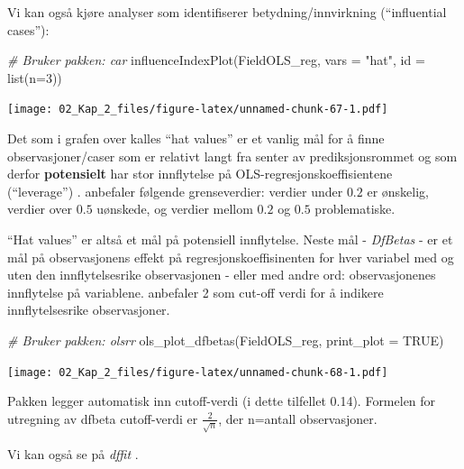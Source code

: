 \documentclass[
]{article}
\newenvironment{Shaded}{\begin{snugshade}}{\end{snugshade}}
\newcommand{\AttributeTok}[1]{\textcolor[rgb]{0.77,0.63,0.00}{#1}}
\newcommand{\CommentTok}[1]{\textcolor[rgb]{0.56,0.35,0.01}{\textit{#1}}}
\newcommand{\ConstantTok}[1]{\textcolor[rgb]{0.00,0.00,0.00}{#1}}
\newcommand{\DecValTok}[1]{\textcolor[rgb]{0.00,0.00,0.81}{#1}}
\newcommand{\FunctionTok}[1]{\textcolor[rgb]{0.00,0.00,0.00}{#1}}
\newcommand{\NormalTok}[1]{#1}
\newcommand{\StringTok}[1]{\textcolor[rgb]{0.31,0.60,0.02}{#1}}
\begin{document}
Vi kan også kjøre analyser som identifiserer betydning/innvirkning (``influential cases''):

\begin{Shaded}
\begin{Highlighting}[]
\CommentTok{\# Bruker pakken: car}
\FunctionTok{influenceIndexPlot}\NormalTok{(FieldOLS\_reg, }\AttributeTok{vars =} \StringTok{"hat"}\NormalTok{, }\AttributeTok{id =} \FunctionTok{list}\NormalTok{(}\AttributeTok{n=}\DecValTok{3}\NormalTok{))}
\end{Highlighting}
\end{Shaded}

\texttt{[image: 02\_Kap\_2\_files/figure-latex/unnamed-chunk-67-1.pdf]}

Det som i grafen over kalles ``hat values'' er et vanlig mål for å finne observasjoner/caser som er relativt langt fra senter av prediksjonsrommet og som derfor \textbf{potensielt} har stor innflytelse på OLS-regresjonskoeffisientene (``leverage'') \citep{foxCompanionAppliedRegression2019}. \citet{huberRobustStatistics1981} anbefaler følgende grenseverdier: verdier under \(0.2\) er ønskelig, verdier over \(0.5\) uønskede, og verdier mellom \(0.2\) og \(0.5\) problematiske.

``Hat values'' er altså et mål på potensiell innflytelse. Neste mål - \emph{DfBetas} - er et mål på observasjonens effekt på regresjonskoeffisinenten for hver variabel med og uten den innflytelsesrike observasjonen - eller med andre ord: observasjonenes innflytelse på variablene. \citet{belsleyRegressionDiagnosticsIdentifying1980} anbefaler 2 som cut-off verdi for å indikere innflytelsesrike observasjoner.

\begin{Shaded}
\begin{Highlighting}[]
\CommentTok{\# Bruker pakken: olsrr}
\FunctionTok{ols\_plot\_dfbetas}\NormalTok{(FieldOLS\_reg, }\AttributeTok{print\_plot =} \ConstantTok{TRUE}\NormalTok{)}
\end{Highlighting}
\end{Shaded}

\texttt{[image: 02\_Kap\_2\_files/figure-latex/unnamed-chunk-68-1.pdf]}

Pakken legger automatisk inn cutoff-verdi (i dette tilfellet 0.14). Formelen for utregning av dfbeta cutoff-verdi er \(\frac{2}{\sqrt{n}}\), der n=antall observasjoner.

Vi kan også se på \emph{dffit} \citep{welschLinearRegressionDiagnostics1977}.
\end{document}
